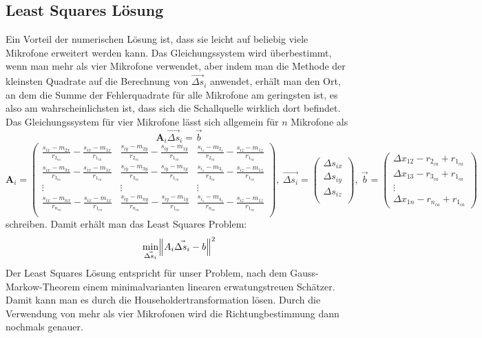 \subsection{Least Squares Lösung}
Ein Vorteil der numerischen Lösung ist, dass sie leicht auf beliebig viele Mikrofone erweitert werden kann. Das Gleichungssystem wird überbestimmt, wenn man mehr als vier Mikrofone verwendet, aber indem man die Methode der kleinsten Quadrate auf die Berechnung von $\vec{\Delta{s}}_i$ anwendet, erhält man den Ort, an dem die Summe der Fehlerquadrate für alle Mikrofone am geringsten ist, es also am wahrscheinlichsten ist, dass sich die Schallquelle wirklich dort befindet.
Das Gleichungssystem für vier Mikrofone lässt sich allgemein für $n$ Mikrofone als
$$
\textbf{A}_i\vec{\Delta{s}}_i = \vec{b}
$$
$$
\textbf{A}_i =
{\begin{pmatrix}
\frac{s_{ix} - m_{2x}}{r_{2_{ca}}} - \frac{s_{ix} - m_{1x}}{r_{1_{ca}}} & \frac{s_{iy} - m_{2y}}{r_{2_{ca}}} - \frac{s_{iy} - m_{1y}}{r_{1_{ca}}} & \frac{s_{i_z} - m_{2_z}}{r_{2_{ca}}} - \frac{s_{iz} - m_{1z}}{r_{1_{ca}}} \\
\frac{s_{ix} - m_{3x}}{r_{3_{ca}}} - \frac{s_{ix} - m_{1x}}{r_{1_{ca}}} & \frac{s_{iy} - m_{3y}}{r_{3_{ca}}} - \frac{s_{iy} - m_{1y}}{r_{1_{ca}}} & \frac{s_{i_z} - m_{3_z}}{r_{3_{ca}}} - \frac{s_{iz} - m_{1z}}{r_{1_{ca}}} \\
\vdots & \vdots & \vdots \\
\frac{s_{ix} - m_{nx}}{r_{n_{ca}}} - \frac{s_{ix} - m_{1x}}{r_{1_{ca}}} & \frac{s_{iy} - m_{ny}}{r_{n_{ca}}} - \frac{s_{iy} - m_{1y}}{r_{1_{ca}}} & \frac{s_{i_z} - m_{4_z}}{r_{n_{ca}}} - \frac{s_{iz} - m_{1z}}{r_{1_{ca}}} \\
\end{pmatrix}},
~
\vec{\Delta{s}_i} =
\begin{pmatrix}
{\Delta{s}}_{ix} \\
{\Delta{s}}_{iy} \\
{\Delta{s}}_{iz} \\
\end{pmatrix},
~
\vec{b} =
\begin{pmatrix}
\Delta{x_{12}} - r_{2_{ca}} + r_{1_{ca}}\\
\Delta{x_{13}} - r_{3_{ca}} + r_{1_{ca}}\\
\vdots \\
\Delta{x_{1n}} - r_{n_{ca}} + r_{1_{ca}}
\end{pmatrix}
$$
schreiben.
Damit erhält man das Least Squares Problem:
$$
\min_{\vec{\Delta{s}_i}}{\norm{A_i\vec{\Delta{s}_i} - b}^2}
$$
Der Least Squares Lösung entspricht für unser Problem, nach dem Gauss-Markow-Theorem einem minimalvarianten linearen erwatungstreuen Schätzer. Damit kann man es durch die Householdertransformation\cite{householder2006principles} lösen. Durch die Verwendung von mehr als vier Mikrofonen wird die Richtungbestimmung dann nochmals genauer.
